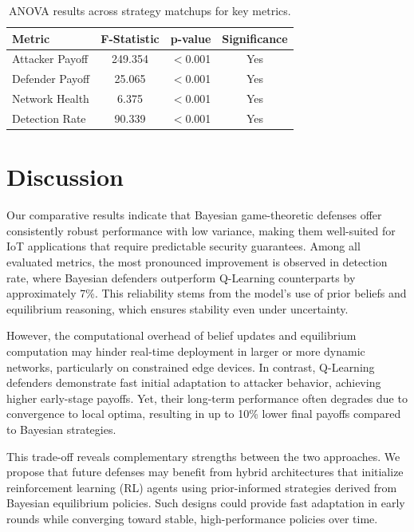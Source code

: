 \documentclass[conference]{IEEEtran}
\begin{document}
\begin{table}[htbp]
  \centering
  \caption{ANOVA results across strategy matchups for key metrics.}
  \label{tab:anova}
  \begin{tabular}{lccc}
    \toprule
    \textbf{Metric} & \textbf{F-Statistic} & \textbf{p-value} & \textbf{Significance} \\
    \midrule
    Attacker Payoff & 249.354 & $<$0.001 & Yes \\
    Defender Payoff & 25.065  & $<$0.001 & Yes \\
    Network Health  & 6.375   & $<$0.001 & Yes \\
    Detection Rate  & 90.339  & $<$0.001 & Yes \\
    \bottomrule
  \end{tabular}
\end{table}

\section{Discussion}

Our comparative results indicate that Bayesian game-theoretic defenses offer consistently robust performance with low variance, making them well-suited for IoT applications that require predictable security guarantees. Among all evaluated metrics, the most pronounced improvement is observed in detection rate, where Bayesian defenders outperform Q-Learning counterparts by approximately 7\%. This reliability stems from the model's use of prior beliefs and equilibrium reasoning, which ensures stability even under uncertainty.

However, the computational overhead of belief updates and equilibrium computation may hinder real-time deployment in larger or more dynamic networks, particularly on constrained edge devices. In contrast, Q-Learning defenders demonstrate fast initial adaptation to attacker behavior, achieving higher early-stage payoffs. Yet, their long-term performance often degrades due to convergence to local optima, resulting in up to 10\% lower final payoffs compared to Bayesian strategies.

This trade-off reveals complementary strengths between the two approaches. We propose that future defenses may benefit from hybrid architectures that initialize reinforcement learning (RL) agents using prior-informed strategies derived from Bayesian equilibrium policies. Such designs could provide fast adaptation in early rounds while converging toward stable, high-performance policies over time.
\end{document}
